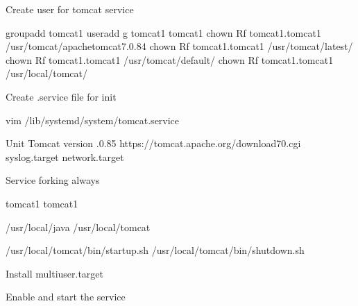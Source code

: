 \documentclass[letterpaper,10pt,english]{sphinxmanual}
\begin{document}
Create user for tomcat service

%
\begin{sphinxVerbatim}[commandchars=\\\{\}]
groupadd tomcat1
useradd \PYGZhy{}g tomcat1 tomcat1
chown \PYGZhy{}Rf tomcat1.tomcat1 /usr/tomcat/apache\PYGZhy{}tomcat\PYGZhy{}7.0.84
chown \PYGZhy{}Rf tomcat1.tomcat1 /usr/tomcat/latest/
chown \PYGZhy{}Rf tomcat1.tomcat1 /usr/tomcat/default/
chown \PYGZhy{}Rf tomcat1.tomcat1 /usr/local/tomcat/
\end{sphinxVerbatim}

Create .service file for init

%
\begin{sphinxVerbatim}[commandchars=\\\{\}]
vim /lib/systemd/system/tomcat.service
\end{sphinxVerbatim}

%
\begin{sphinxVerbatim}[commandchars=\\\{\}]
\PYG{o}{[}Unit\PYG{o}{]}
Tomcat version .0.85
https://tomcat.apache.org/download\PYGZhy{}70.cgi
syslog.target
network.target

\PYG{o}{[}Service\PYG{o}{]}
forking
always

tomcat1
tomcat1

/usr/local/java
/usr/local/tomcat

/usr/local/tomcat/bin/startup.sh
/usr/local/tomcat/bin/shutdown.sh


\PYG{o}{[}Install\PYG{o}{]}
multi\PYGZhy{}user.target
\end{sphinxVerbatim}

Enable and start the service
\end{document}
